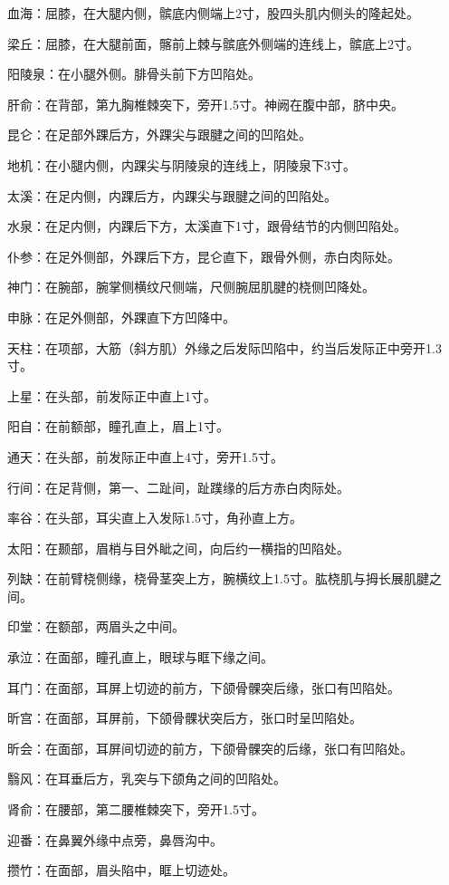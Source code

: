 \documentclass[12pt,UTF8,openany]{ctexbook}
\begin{document}
血海：屈膝，在大腿内侧，髌底内侧端上2寸，股四头肌内侧头的隆起处。

梁丘：屈膝，在大腿前面，髂前上棘与髌底外侧端的连线上，髌底上2寸。

阳陵泉：在小腿外侧。腓骨头前下方凹陷处。

肝俞：在背部，第九胸椎棘突下，旁开1.5寸。神阙在腹中部，脐中央。

昆仑：在足部外踝后方，外踝尖与跟腱之间的凹陷处。

地机：在小腿内侧，内踝尖与阴陵泉的连线上，阴陵泉下3寸。

太溪：在足内侧，内踝后方，内踝尖与跟腱之间的凹陷处。

水泉：在足内侧，内踝后下方，太溪直下1寸，跟骨结节的内侧凹陷处。

仆参：在足外侧部，外踝后下方，昆仑直下，跟骨外侧，赤白肉际处。

神门：在腕部，腕掌侧横纹尺侧端，尺侧腕屈肌腱的桡侧凹降处。

申脉：在足外侧部，外踝直下方凹降中。

天柱：在项部，大筋（斜方肌）外缘之后发际凹陷中，约当后发际正中旁开1.3寸。

上星：在头部，前发际正中直上1寸。

阳自：在前额部，瞳孔直上，眉上1寸。

通天：在头部，前发际正中直上4寸，旁开1.5寸。

行间：在足背侧，第一、二趾间，趾蹼缘的后方赤白肉际处。

率谷：在头部，耳尖直上入发际1.5寸，角孙直上方。

太阳：在颞部，眉梢与目外眦之间，向后约一横指的凹陷处。

列缺：在前臂桡侧缘，桡骨茎突上方，腕横纹上1.5寸。肱桡肌与拇长展肌腱之间。

印堂：在额部，两眉头之中间。

承泣：在面部，瞳孔直上，眼球与眶下缘之间。

耳门：在面部，耳屏上切迹的前方，下颌骨髁突后缘，张口有凹陷处。

昕宫：在面部，耳屏前，下颌骨髁状突后方，张口时呈凹陷处。

昕会：在面部，耳屏间切迹的前方，下颌骨髁突的后缘，张口有凹陷处。

翳风：在耳垂后方，乳突与下颌角之间的凹陷处。

肾俞：在腰部，第二腰椎棘突下，旁开1.5寸。

迎番：在鼻翼外缘中点旁，鼻唇沟中。

攒竹：在面部，眉头陷中，眶上切迹处。
\end{document}
